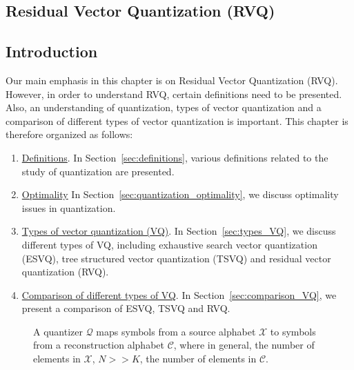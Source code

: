 


\begin{FrontMatter}
\contents %
\end{FrontMatter}
\begin{Body}
\chapter{Residual Vector Quantization (RVQ)}
\label{chap_RVQ}	
\section{Introduction}
\label{sec:introduction}
Our main emphasis in this chapter is on Residual Vector Quantization (RVQ).  However, in order to understand RVQ, certain definitions need to be presented.  Also, an understanding of quantization, types of vector quantization and a comparison of different types of vector quantization is important.  This chapter is therefore organized as follows:

\begin{enumerate}
\item \underline{Definitions}.  In Section~\ref{sec:definitions}, various definitions related to the study of quantization are presented.
\item \underline{Optimality} In Section~\ref{sec:quantization_optimality}, we discuss optimality issues in quantization.
\item \underline{Types of vector quantization (VQ)}.  In Section~\ref{sec:types_VQ}, we discuss different types of VQ, including exhaustive search vector quantization (ESVQ),  tree structured vector quantization (TSVQ) and residual vector quantization (RVQ).
\item \underline{Comparison of different types of VQ}.  In Section~\ref{sec:comparison_VQ}, we present a comparison of ESVQ, TSVQ and RVQ.
\end{enumerate}

								\begin{figure}[t]	
								\centering		
								\caption{A quantizer $\mathcal{Q}$ maps symbols from a source alphabet $\mathcal{X}$ to symbols from a reconstruction alphabet $\mathcal{C}$, where in general, the number of elements in $\mathcal{X}$, $N >> K$, the number of elements in $\mathcal{C}$.}
								\label{fig:Quantization_block_diagram}
								\end{figure}



\end{Body}
